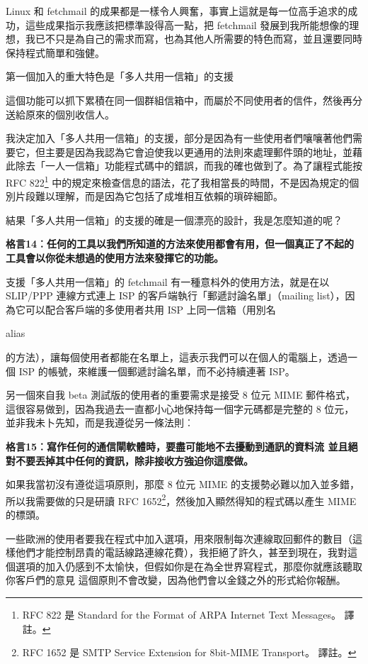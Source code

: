 \documentclass[10pt, b5paper]{book}
\makeatletter
\newcommand*{\shifttext}[2]{%
  \settowidth{\@tempdima}{#2}%
  \makebox[\@tempdima]{\hspace*{#1}#2}%
}
\makeatother
\begin{document}
Linux 和 fetchmail
的成果都是一樣令人興奮，事實上這就是每一位高手追求的成功，這些成果指示我應該把標準設得高一點，把
fetchmail
發展到我所能想像的理想，我已不只是為自己的需求而寫，也為其他人所需要的特色而寫，並且還要同時保持程式簡單和強健。

第一個加入的重大特色是「多人共用一信箱」的支援 \shifttext{1pt}{---}\shifttext{-1pt}{---}
這個功能可以抓下累積在同一個群組信箱中，而屬於不同使用者的信件，然後再分送給原來的個別收信人。

我決定加入「多人共用一信箱」的支援，部分是因為有一些使用者們嚷嚷著他們需要它，但主要是因為我認為它會迫使我以更通用的法則來處理郵件頭的地址，並藉此除去「一人一信箱」功能程式碼中的錯誤，而我的確也做到了。為了讓程式能按
RFC 822\footnote{RFC 822 是 Standard for the Format of ARPA Internet
  Text Messages。 \shifttext{1pt}{---}\shifttext{-1pt}{---} 譯註。}
中的規定來檢查信息的語法，花了我相當長的時間，不是因為規定的個別片段難以理解，而是因為它包括了成堆相互依賴的瑣碎細節。

結果「多人共用一信箱」的支援的確是一個漂亮的設計，我是怎麼知道的呢？

\textbf{格言14︰任何的工具以我們所知道的方法來使用都會有用，但一個真正了不起的工具會以你從未想過的使用方法來發揮它的功能。}

支援「多人共用一信箱」的 fetchmail 有一種意枓外的使用方法，就是在以
SLIP/PPP 連線方式連上 ISP 的客戶端執行「郵遞討論名單」（mailing
list），因為它可以配合客戶端的多使用者共用 ISP 上同一信箱（用別名 \shifttext{1pt}{---}\shifttext{-1pt}{---}
alias \shifttext{1pt}{---}\shifttext{-1pt}{---}
的方法），讓每個使用者都能在名單上，這表示我們可以在個人的電腦上，透過一個
ISP 的帳號，來維護一個郵遞討論名單，而不必持續連著 ISP。

另一個來自我 beta 測試版的使用者的重要需求是接受 8 位元 MIME
郵件格式，這很容易做到，因為我過去一直都小心地保持每一個字元碼都是完整的 8
位元，並非我未卜先知，而是我遵從另一條法則︰

\textbf{格言15︰寫作任何的通信閘軟體時，要盡可能地不去擾動到通訊的資料流
\shifttext{1pt}{---}\shifttext{-1pt}{---} 並且絕對不要丟掉其中任何的資訊，除非接收方強迫你這麼做。}

如果我當初沒有遵從這項原則，那麼 8 位元 MIME
的支援勢必難以加入並多錯，所以我需要做的只是研讀 RFC 1652\footnote{RFC
  1652 是 SMTP Service Extension for 8bit-MIME Transport。 \shifttext{1pt}{---}\shifttext{-1pt}{---} 譯註。}，然後加入顯然得知的程式碼以產生
MIME 的標頭。

一些歐洲的使用者要我在程式中加入選項，用來限制每次連線取回郵件的數目（這樣他們才能控制昂貴的電話線路連線花費），我拒絕了許久，甚至到現在，我對這個選項的加入仍感到不太愉快，但假如你是在為全世界寫程式，那麼你就應該聽取你客戶們的意見
\shifttext{1pt}{---}\shifttext{-1pt}{---} 這個原則不會改變，因為他們會以金錢之外的形式給你報酬。
\end{document}

